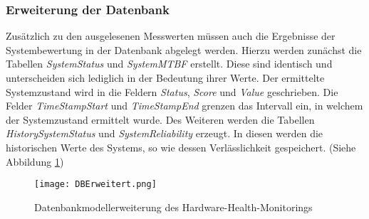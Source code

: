 \subsubsection*{Erweiterung der Datenbank}
Zusätzlich zu den ausgelesenen Messwerten müssen auch die Ergebnisse der Systembewertung in der Datenbank abgelegt werden. 
Hierzu werden zunächst die Tabellen \textit{SystemStatus} und \textit{SystemMTBF} erstellt. Diese sind identisch und unterscheiden sich lediglich in der Bedeutung ihrer Werte. Der ermittelte Systemzustand wird in die Feldern \textit{Status}, \textit{Score} und \textit{Value} geschrieben. Die Felder \textit{TimeStampStart} und \textit{TimeStampEnd} grenzen das Intervall ein, in welchem der Systemzustand ermittelt wurde. Des Weiteren werden die Tabellen \textit{HistorySystemStatus} und \textit{SystemReliability} erzeugt. In diesen werden die historischen Werte des Systems, so wie dessen Verlässlichkeit gespeichert. (Siehe Abbildung \ref{fig:DBModellErweitert})   
\begin{center}
    \begin{figure}[h!]
        \centering
        \texttt{[image: DBErweitert.png]}
        \caption{Datenbankmodellerweiterung des Hardware-Health-Monitorings}
        \label{fig:DBModellErweitert}
    \end{figure}
\end{center}
\vspace{-1.8cm}

